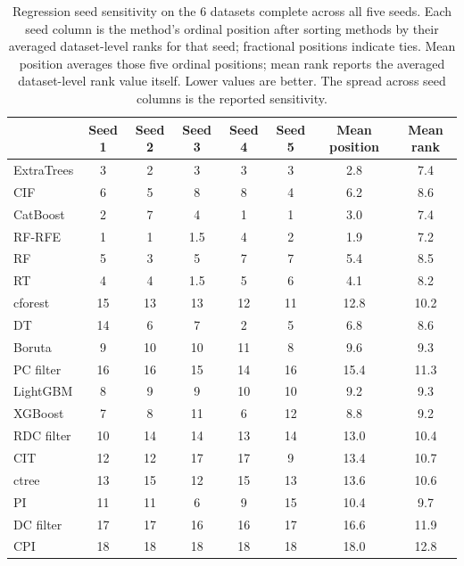 \begin{table}[!htbp]
  \centering
  \footnotesize
  \setlength{\tabcolsep}{4pt}
  \renewcommand{\arraystretch}{1.04}
  \begin{tabular}{@{}l
    S[table-format=2.0]
    S[table-format=2.0]
    S[table-format=2.0]
    S[table-format=2.0]
    S[table-format=2.0]
    S[table-format=2.1]
    S[table-format=2.1]@{}}
    \toprule
     & {Seed 1} & {Seed 2} & {Seed 3} & {Seed 4} & {Seed 5} & {Mean position} & {Mean rank} \\
    \midrule
    ExtraTrees & 3 & 2 & 3 & 3 & 3 & 2.8 & 7.4 \\
    CIF & 6 & 5 & 8 & 8 & 4 & 6.2 & 8.6 \\
    CatBoost & 2 & 7 & 4 & 1 & 1 & 3.0 & 7.4 \\
    RF-RFE & 1 & 1 & 1.5 & 4 & 2 & 1.9 & 7.2 \\
    RF & 5 & 3 & 5 & 7 & 7 & 5.4 & 8.5 \\
    RT & 4 & 4 & 1.5 & 5 & 6 & 4.1 & 8.2 \\
    cforest & 15 & 13 & 13 & 12 & 11 & 12.8 & 10.2 \\
    DT & 14 & 6 & 7 & 2 & 5 & 6.8 & 8.6 \\
    Boruta & 9 & 10 & 10 & 11 & 8 & 9.6 & 9.3 \\
    PC filter & 16 & 16 & 15 & 14 & 16 & 15.4 & 11.3 \\
    LightGBM & 8 & 9 & 9 & 10 & 10 & 9.2 & 9.3 \\
    XGBoost & 7 & 8 & 11 & 6 & 12 & 8.8 & 9.2 \\
    RDC filter & 10 & 14 & 14 & 13 & 14 & 13.0 & 10.4 \\
    CIT & 12 & 12 & 17 & 17 & 9 & 13.4 & 10.7 \\
    ctree & 13 & 15 & 12 & 15 & 13 & 13.6 & 10.6 \\
    PI & 11 & 11 & 6 & 9 & 15 & 10.4 & 9.7 \\
    DC filter & 17 & 17 & 16 & 16 & 17 & 16.6 & 11.9 \\
    CPI & 18 & 18 & 18 & 18 & 18 & 18.0 & 12.8 \\
    \bottomrule
  \end{tabular}
  \caption{Regression seed sensitivity on the 6 datasets complete across all
  five seeds. Each seed column is the method's ordinal position after sorting
  methods by their averaged dataset-level ranks for that seed; fractional
  positions indicate ties. Mean position
  averages those five ordinal positions; mean rank reports the averaged
  dataset-level rank value itself. Lower values are better. The spread across seed columns is the reported sensitivity.}
  \label{tab:regression-seed-sensitivity}
\end{table}
